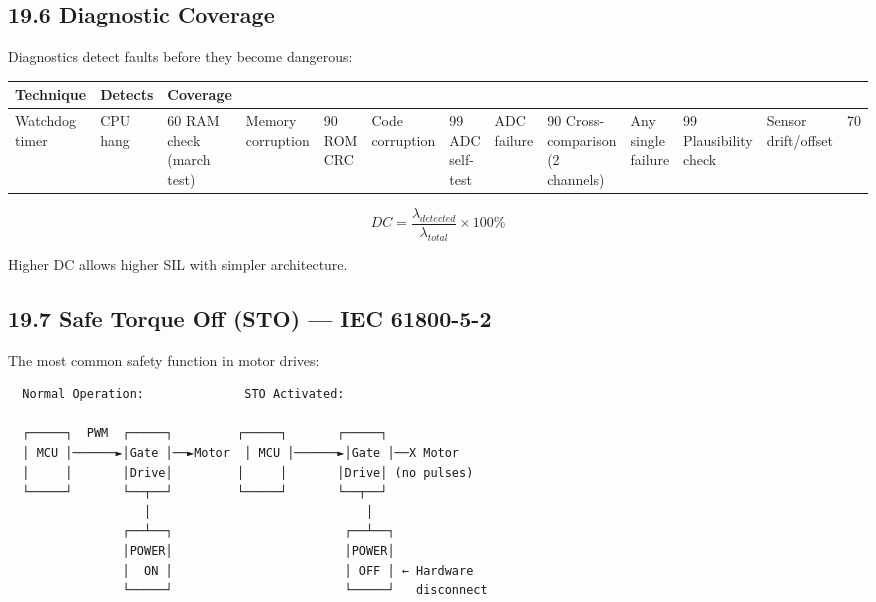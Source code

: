 \documentclass[11pt,a4paper]{book}
\begin{document}
\begin{itemize}
\medskip\noindent\hrulefill\medskip

\subsection{19.6 Diagnostic Coverage}

Diagnostics detect faults before they become dangerous:

\begin{center}
\begin{tabular}{|l|l|l|}
\hline
Technique & Detects & Coverage \\
\hline
Watchdog timer & CPU hang & 60%
RAM check (march test) & Memory corruption & 90%
ROM CRC & Code corruption & 99%
ADC self-test & ADC failure & 90%
Cross-comparison (2 channels) & Any single failure & 99%
Plausibility check & Sensor drift/offset & 70%
\hline
\end{tabular}
\end{center}

\[DC = \frac{\lambda_{detected}}{\lambda_{total}} \times 100\%\]

Higher DC allows higher SIL with simpler architecture.

\medskip\noindent\hrulefill\medskip

\subsection{19.7 Safe Torque Off (STO) — IEC 61800-5-2}

The most common safety function in motor drives:

\begin{lstlisting}
  Normal Operation:              STO Activated:
  
  ┌─────┐  PWM  ┌─────┐         ┌─────┐       ┌─────┐
  │ MCU │──────►│Gate │──►Motor  │ MCU │──────►│Gate │──X Motor
  │     │       │Drive│         │     │       │Drive│ (no pulses)
  └─────┘       └──┬──┘         └─────┘       └──┬──┘
                   │                              │
                ┌──┴──┐                        ┌──┴──┐
                │POWER│                        │POWER│
                │  ON │                        │ OFF │ ← Hardware
                └─────┘                        └─────┘   disconnect
  

\end{lstlisting}
\end{itemize}
\end{document}
